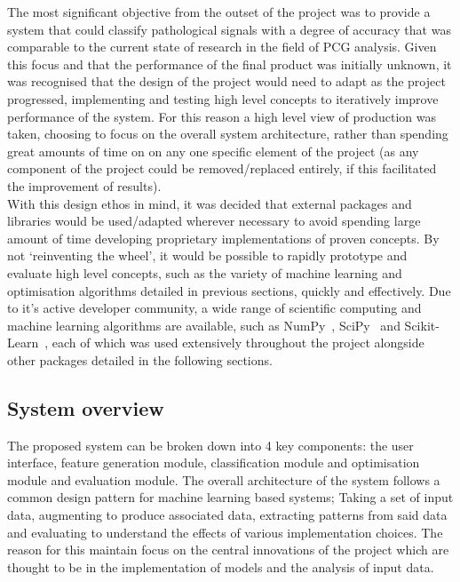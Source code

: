 \documentclass[titlepage, 12pt]{scrartcl} \usepackage{enumitem}
\begin{document}
The most significant objective from the outset of the project was to provide a
system that could classify pathological signals with a degree of accuracy that
was comparable to the current state of research in the field of PCG analysis.
Given this focus and that the performance of the final product was initially
unknown, it was recognised that the design of the project would need to adapt
as the project progressed, implementing and testing high level concepts to
iteratively improve performance of the system. For this reason a high level
view of production was taken, choosing to focus on the overall system
architecture, rather than spending great amounts of time on on any one specific
element of the project (as any component of the project could be
removed/replaced entirely, if this facilitated the improvement of results).\\

With this design ethos in mind, it was decided that external packages and
libraries would be used/adapted wherever necessary to avoid spending large
amount of time developing proprietary implementations of proven concepts. By
not `reinventing the wheel', it would be possible to rapidly prototype and
evaluate high level concepts, such as the variety of machine learning and
optimisation algorithms detailed in previous sections, quickly and effectively.
Due to it's active developer community, a wide range of scientific computing
and machine learning algorithms are available, such as
NumPy~\parencite{VanDerWalt2011}, SciPy~\parencite{Millman2011} and
Scikit-Learn~\parencite{Pedregosa2011}, each of which was used extensively
throughout the project alongside other packages detailed in the following
sections.

\subsection{System overview}
The proposed system can be broken down into 4 key components: the user
interface, feature generation module, classification module and optimisation
module and evaluation module. The overall architecture of the system follows a
common design pattern for machine learning based systems; Taking a set of input
data, augmenting to produce associated data, extracting patterns from said
data and evaluating to understand the effects of various implementation
choices. The reason for this maintain focus on the central innovations of the
project which are thought to be in the implementation of models and the
analysis of input data.
\end{document}

